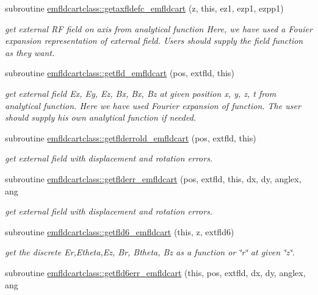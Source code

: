 \begin{DoxyCompactItemize}
subroutine \mbox{\hyperlink{namespaceemfldcartclass_abe4d0916e2997f8145abad1eb026ea9d}{emfldcartclass\+::getaxfldefc\+\_\+emfldcart}} (z, this, ez1, ezp1, ezpp1)
\begin{DoxyCompactList}\small\item\em get external RF field on axis from analytical function Here, we have used a Fouier expansion representation of external field. Users should supply the field function as they want. \end{DoxyCompactList}\item 
subroutine \mbox{\hyperlink{namespaceemfldcartclass_a77a88279f5b3f9878199cf20d7e4c5a5}{emfldcartclass\+::getfld\+\_\+emfldcart}} (pos, extfld, this)
\begin{DoxyCompactList}\small\item\em get external field Ex, Ey, Ez, Bx, Bx, Bz at given position x, y, z, t from analytical function. Here we have used Fourier expansion of function. The user should supply his own analytical function if needed. \end{DoxyCompactList}\item 
subroutine \mbox{\hyperlink{namespaceemfldcartclass_a8ab65fe6671e5e09361a2d44930aa93a}{emfldcartclass\+::getflderrold\+\_\+emfldcart}} (pos, extfld, this)
\begin{DoxyCompactList}\small\item\em get external field with displacement and rotation errors. \end{DoxyCompactList}\item 
subroutine \mbox{\hyperlink{namespaceemfldcartclass_a4c48df0aca1d75a2301a87c5b1c0304d}{emfldcartclass\+::getflderr\+\_\+emfldcart}} (pos, extfld, this, dx, dy, anglex, ang
\begin{DoxyCompactList}\small\item\em get external field with displacement and rotation errors. \end{DoxyCompactList}\item 
subroutine \mbox{\hyperlink{namespaceemfldcartclass_a099681f57177c62b1715bde0b0fe93bb}{emfldcartclass\+::getfld6\+\_\+emfldcart}} (this, z, extfld6)
\begin{DoxyCompactList}\small\item\em get the discrete Er,Etheta,Ez, Br, Btheta, Bz as a function or \char`\"{}r\char`\"{} at given \char`\"{}z\char`\"{}. \end{DoxyCompactList}\item 
subroutine \mbox{\hyperlink{namespaceemfldcartclass_a1b849dab96a221608dde6ea08028e459}{emfldcartclass\+::getfld6err\+\_\+emfldcart}} (this, pos, extfld, dx, dy, anglex, ang

\end{DoxyCompactItemize}
